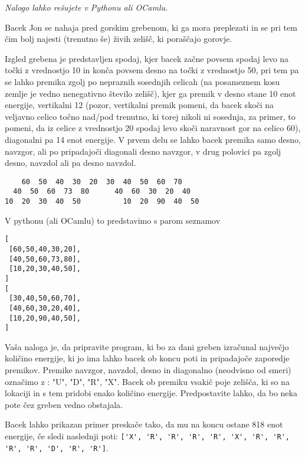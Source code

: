 \documentclass[arhiv]{../izpit}
\begin{document}

\naloga

\emph{Nalogo lahko rešujete v Pythonu ali OCamlu.}

Bacek Jon se nahaja pred gorskim grebenom, 
ki ga mora preplezati in se pri tem čim bolj 
najesti (trenutno še) živih zelišč, ki poraščajo 
gorovje.

Izgled grebena je predstavljen spodaj, kjer 
bacek začne povsem spodaj levo na točki z 
vrednostjo 10 in konča povsem desno na točki 
z vrednostjo 50, pri tem pa se lahko premika 
zgolj po nepraznih sosednjih celicah (na posameznem 
kosu zemlje je vedno nenegativno število zelišč), 
kjer ga premik v desno stane 10 enot energije, 
vertikalni 12 (pozor, vertikalni premik pomeni, da bacek skoči na veljavno celico točno nad/pod trenutno, ki torej nikoli ni sosednja, za primer, to pomeni, da iz celice z vrednostjo 20 spodaj levo skoči naravnost gor na celico 60), diagonalni pa 14 enot energije. 
V prvem delu se lahko bacek 
premika samo desno, navzgor, ali po pripadajoči 
diagonali desno navzgor, v drug polovici pa zgolj desno, navzdol
ali pa desno navzdol. 
\begin{verbatim}
    60  50  40  30  20  30  40  50  60  70
  40  50  60  73  80      40  60  30  20  40
10  20  30  40  50          10  20  90  40  50
\end{verbatim}

V pythonu (ali OCamlu) to predstavimo s parom seznamov
\begin{verbatim}
[
 [60,50,40,30,20],
 [40,50,60,73,80],
 [10,20,30,40,50],
]
[
 [30,40,50,60,70],
 [40,60,30,20,40],
 [10,20,90,40,50],
]
\end{verbatim}

Vaša naloga je, da pripravite program, ki bo za dani greben
izračunal največjo količino energije, ki jo ima lahko bacek 
ob koncu poti in pripadajoče zaporedje premikov. Premike navzgor, navzdol, desno in diagonalno (neodvisno od smeri) označimo z : "U", "D", "R", "X".
Bacek ob premiku vsakič poje zelišča, ki so 
na lokaciji in s tem pridobi enako količino energije.
Predpostavite lahko, da bo neka pote čez greben vedno obstajala.

Bacek lahko prikazan primer preskače tako, da mu na koncu ostane 818 enot energije, če sledi naslednji poti: \verb|['X', 'R', 'R', 'R', 'R', 'X', 'R', 'R', 'R', 'R', 'D', 'R', 'R']|.
\end{document}
